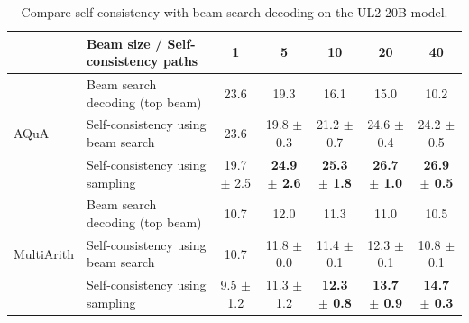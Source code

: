 \documentclass{article} %
\begin{document}
\begin{table}[h]
\setlength\tabcolsep{3pt}
\small
    \centering
    \vspace{-0.1in}
    \begin{tabular}{ll ccccc}
    \toprule
        & Beam size / Self-consistency paths & 1 & 5 & 10 & 20 & 40\\
\midrule
\multirow{3}{*}{AQuA} & Beam search decoding (top beam) & 23.6 & 19.3 & 16.1 & 15.0 &10.2  \\
& Self-consistency using beam search & 23.6 & 19.8 \scriptsize{$\pm$ 0.3} & 21.2 \scriptsize{$\pm$ 0.7} & 24.6 \scriptsize{$\pm$ 0.4} & 24.2 \scriptsize{$\pm$ 0.5}\\
& Self-consistency using sampling & 19.7 \scriptsize{$\pm$ 2.5} & \textbf{24.9 \scriptsize{$\pm$ 2.6}} & \textbf{25.3 \scriptsize{$\pm$ 1.8}} & \textbf{26.7 \scriptsize{$\pm$ 1.0}} & \textbf{26.9 \scriptsize{$\pm$ 0.5}} \\
\midrule
\multirow{3}{*}{MultiArith} & Beam search decoding (top beam) & 10.7 & 12.0 &11.3 & 11.0 &10.5\\
& Self-consistency using beam search & 10.7 & 11.8 \scriptsize{$\pm$ 0.0} & 11.4 \scriptsize{$\pm$ 0.1} &12.3 \scriptsize{$\pm$ 0.1} & 10.8 \scriptsize{$\pm$ 0.1}\\
& Self-consistency using sampling & 9.5 \scriptsize{$\pm$ 1.2} & 11.3 \scriptsize{$\pm$ 1.2} & \textbf{12.3 \scriptsize{$\pm$ 0.8}} & \textbf{13.7 \scriptsize{$\pm$ 0.9}} & \textbf{14.7 \scriptsize{$\pm$ 0.3}}\\
\bottomrule
    \end{tabular}
    \vspace{-0.1in}
    \caption{Compare self-consistency with beam search decoding on the UL2-20B model.}
    \label{tab:beam_search}
    \vspace{-0.1in}
\end{table}

\vspace{-0.1in}
\end{document}
